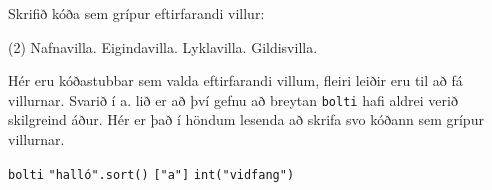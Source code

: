 \begin{exercise}\label{vil2}
Skrifið kóða sem grípur eftirfarandi villur:
	\begin{tasks}(2)
		\task\label{vil2-a} Nafnavilla.  
		\task\label{vil2-b} Eigindavilla.
		\task\label{vil2-c} Lyklavilla.
		\task\label{vil2-d} Gildisvilla.
	\end{tasks}
\end{exercise}
\begin{Answer}[ref={vil2}]
Hér eru kóðastubbar sem valda eftirfarandi villum, fleiri leiðir eru til að fá villurnar.
Svarið í a. lið er að því gefnu að breytan \texttt{bolti} hafi aldrei verið skilgreind áður.
Hér er það í höndum lesenda að skrifa svo kóðann sem grípur villurnar.
\begin{tasks}
	\task \texttt{bolti}
	\task \texttt{"halló".sort()}
	\task \texttt{{}["a"]} 
	\task \texttt{int("vidfang")}
\end{tasks}
\newpage
\end{Answer}